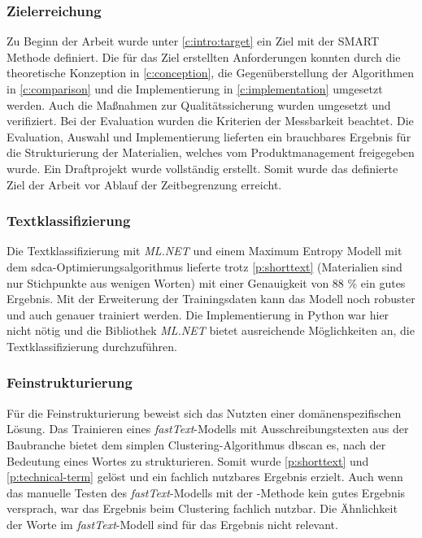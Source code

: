 \subsubsection{Zielerreichung}
Zu Beginn der Arbeit wurde unter \autoref{c:intro:target} ein Ziel mit der SMART Methode definiert. Die für das Ziel erstellten Anforderungen konnten durch die theoretische Konzeption in \autoref{c:conception}, die Gegenüberstellung der Algorithmen in \autoref{c:comparison} und die Implementierung in \autoref{c:implementation} umgesetzt werden. Auch die Maßnahmen zur Qualitätssicherung wurden umgesetzt und verifiziert. Bei der Evaluation wurden die Kriterien der Messbarkeit beachtet. Die Evaluation, Auswahl und Implementierung lieferten ein brauchbares Ergebnis für die Strukturierung der Materialien, welches vom Produktmanagement freigegeben wurde. Ein Draftprojekt wurde vollständig erstellt. Somit wurde das definierte Ziel der Arbeit vor Ablauf der Zeitbegrenzung erreicht.

\subsubsection{Textklassifizierung}
Die Textklassifizierung mit \textit{ML.NET} und einem Maximum Entropy Modell mit dem \ac{sdca}-Optimierungsalgorithmus lieferte trotz \autoref{p:shorttext} (Materialien sind nur Stichpunkte aus wenigen Worten) mit einer Genauigkeit von 88 \% ein gutes Ergebnis. Mit der Erweiterung der Trainingsdaten kann das Modell noch robuster und auch genauer trainiert werden. Die Implementierung in Python war hier nicht nötig und die Bibliothek \textit{ML.NET} bietet ausreichende Möglichkeiten an, die Textklassifizierung durchzuführen.

\subsubsection{Feinstrukturierung}
Für die Feinstrukturierung beweist sich das Nutzten einer domänenspezifischen Lösung. Das Trainieren eines \textit{fastText}-Modells mit Ausschreibungstexten aus der Baubranche bietet dem simplen Clustering-Algorithmus \ac{dbscan} es, nach der Bedeutung eines Wortes zu strukturieren. Somit wurde \autoref{p:shorttext} und \autoref{p:technical-term} gelöst und ein fachlich nutzbares Ergebnis erzielt. Auch wenn das manuelle Testen des \textit{fastText}-Modells mit der -Methode kein gutes Ergebnis versprach, war das Ergebnis beim Clustering fachlich nutzbar. Die Ähnlichkeit der Worte im \textit{fastText}-Modell sind für das Ergebnis nicht relevant.


